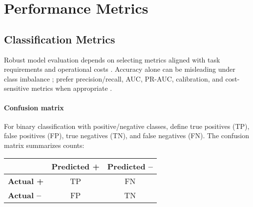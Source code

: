 
\section{Performance Metrics }
\label{sec:performance-metrics}

\subsection{Classification Metrics}

Robust model evaluation depends on selecting metrics aligned with task requirements and operational costs . Accuracy alone can be misleading under class imbalance ; prefer precision/recall, AUC, PR-AUC, calibration, and cost-sensitive metrics when appropriate \textcite{GoodfellowEtAl2016,Prince2023}.

\paragraph{Confusion matrix} For binary classification with positive/negative classes, define true positives (TP), false positives (FP), true negatives (TN), and false negatives (FN). The confusion matrix  summarizes counts:

\begin{center}
\begin{tabular}{@{}lcc@{}}\toprule
 & \textbf{Predicted +} & \textbf{Predicted --} \\
\midrule
\textbf{Actual +} & TP & FN \\
\textbf{Actual --} & FP & TN \\
\bottomrule
\end{tabular}
\end{center}

